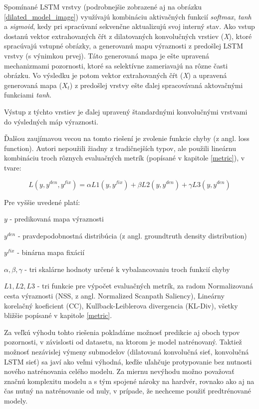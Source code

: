 Spomínané LSTM vrstvy (podrobnejšie zobrazené aj na obrázku \ref{dilated_model_image}) využívajú kombináciu aktivačných funkcií \textit{softmax}, \textit{tanh} a \textit{sigmoid}, kedy pri spracúvaní sekvenčne aktualizujú svoj interný stav. Ako vstup dostanú vektor extrahovaných čŕt z dilatovaných konvolučných vrstiev (\textit{X}), ktoré spracúvajú vstupné obrázky, a generovanú mapu výraznosti z predošlej LSTM vrstvy (s výnimkou prvej). Táto generovaná mapa je ešte upravená mechanizmami pozornosti, ktoré sa selektívne zameriavajú na rôzne časti obrázku. Vo výsledku je potom vektor extrahovaných čŕt (\textit{X}) a upravená generovaná mapa (\textit{$X_t$}) z predošlej vrstvy ešte ďalej spracovávaná aktovačnými funkciami \textit{tanh}.

Výstup z týchto vrstiev je ďalej upravený štandardnými konvolučnými vrstvami do výsledných máp výraznosti.

Ďalšou zaujímavou vecou na tomto riešení je zvolenie funkcie chyby (z angl. loss function). Autori nepoužili žiadny z tradičnejších typov, ale použili lineárnu kombináciu troch rôznych evaluačných metrík (popísané v kapitole \ref{metric}), v tvare:

\begin{equation}
	L (y, y^{den}, y^{fix}) = \alpha L1(y, y^{fix}) + \beta L2(y, y^{den}) + \gamma L3(y, y^{den})
\end{equation}

Pre vyššie uvedené platí:

$y$ - predikovaná mapa výraznosti

$y^{den}$ - pravdepodobnostná distribúcia (z angl. groundtruth density distribution)

$y^{fix}$ - binárna mapa fixácií

$\alpha, \beta, \gamma $ - tri skalárne hodnoty určené k vybalancovaniu troch funkcií chyby

$L1, L2, L3$ - tri funkcie pre výpočet evaluačných metrík, za radom Normalizovaná cesta výraznosti (NSS, z angl. Normalized Scanpath Saliency), Lineárny korelačný koeficient (CC), Kullback-Leiblerova divergencia (KL-Div), všetky bližšie popísané v kapitole \ref{metric}.

Za veľkú výhodu tohto riešenia pokladáme možnosť predikcie aj oboch typov pozornosti, v závislosti od datasetu, na ktorom je model natrénovaný. Taktiež možnosť nezávislej výmeny submodelov (dilatovaná konvolučná sieť,  konvolučná LSTM sieť) sa javí ako veľmi výhodná, keďže uľahčuje protypovanie bez nutnosti nového natrénovania celého modelu. Za miernu nevýhodu možno považovať značnú komplexitu modelu a s tým spojené nároky na hardvér, rovnako ako aj na čas nutný na natrénovanie od nuly, v prípade, že nechceme použiť predtrénované modely. 

